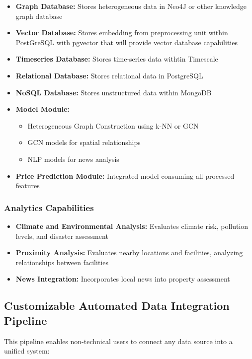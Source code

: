 \begin{itemize}
    \item \textbf{Graph Database:} Stores heterogeneous data in Neo4J or other knowledge graph database
    \item \textbf{Vector Database:} Stores embedding from preprocessing unit within PostGreSQL with pgvector that will provide vector database capabilities
    \item \textbf{Timeseries Database:} Stores time-series data withtin Timescale
    \item \textbf{Relational Database:} Stores relational data in PostgreSQL
    \item \textbf{NoSQL Database:} Stores unstructured data within MongoDB
    \item \textbf{Model Module:} 
    \begin{itemize}
        \item Heterogeneous Graph Construction using k-NN or GCN
        \item GCN models for spatial relationships
        \item NLP models for news analysis
    \end{itemize}
    \item \textbf{Price Prediction Module:} Integrated model consuming all processed features
\end{itemize}

\subsubsection{Analytics Capabilities}
\begin{itemize}
    \item \textbf{Climate and Environmental Analysis:} Evaluates climate risk, pollution levels, and disaster assessment
    \item \textbf{Proximity Analysis:} Evaluates nearby locations and facilities, analyzing relationships between facilities
    \item \textbf{News Integration:} Incorporates local news into property assessment
\end{itemize}

\subsection{Customizable Automated Data Integration Pipeline}
This pipeline enables non-technical users to connect any data source into a unified system:

